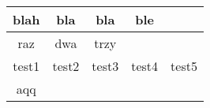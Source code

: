 \documentclass{article}
\begin{document}
\begin{tabular}{|c|c|c|c|c|}\hline
blah & bla & bla & ble
 & \\
\hline
raz & dwa & trzy
 &  & \\
\hline
test1 & test2 & test3 & test4 & test5
\\
\hline
aqq
 &  &  &  & \\
\hline
\end{tabular}
\end{document}
